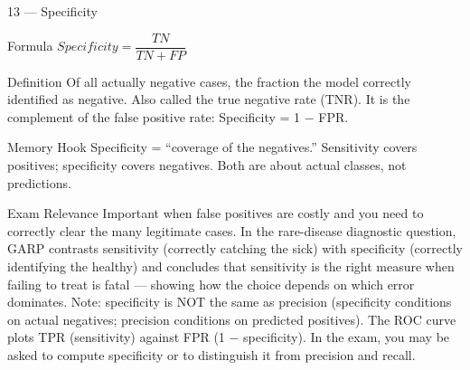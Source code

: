 \documentclass[aspectratio=169,8pt]{beamer}
\begin{document}
	\begin{frame}{13 --- Specificity}
		\begin{block}{Formula}
			$Specificity = \dfrac{TN}{TN + FP}$
		\end{block}
		\begin{block}{Definition}
			Of all actually negative cases, the fraction the model correctly identified as negative. Also called the true negative rate (TNR). It is the complement of the false positive rate: Specificity = 1 $-$ FPR.
		\end{block}
		\begin{block}{Memory Hook}
			Specificity = ``coverage of the negatives.'' Sensitivity covers positives; specificity covers negatives. Both are about actual classes, not predictions.
		\end{block}
		\begin{block}{Exam Relevance}
			Important when false positives are costly and you need to correctly clear the many legitimate cases. In the rare-disease diagnostic question, GARP contrasts sensitivity (correctly catching the sick) with specificity (correctly identifying the healthy) and concludes that sensitivity is the right measure when failing to treat is fatal --- showing how the choice depends on which error dominates. Note: specificity is NOT the same as precision (specificity conditions on actual negatives; precision conditions on predicted positives). The ROC curve plots TPR (sensitivity) against FPR (1 $-$ specificity). In the exam, you may be asked to compute specificity or to distinguish it from precision and recall.
		\end{block}
	\end{frame}
	
\end{document}
